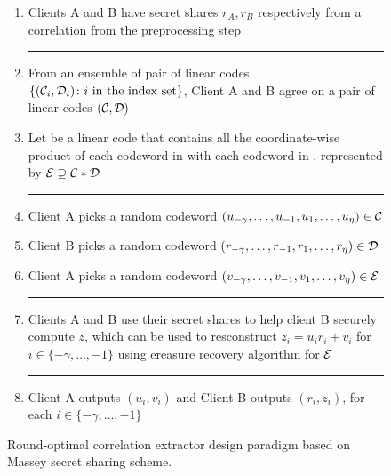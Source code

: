\begin{figure}[htp]%
\begin{boxedalgo}
\begin{enumerate}[leftmargin=5mm]
\item Clients A and B have secret shares $r_A, r_B $ respectively from a correlation from the preprocessing step\\
\hrule
\item %
  From an ensemble of pair of linear codes $\left\{({\mathcal C}_i,{\mathcal D}_i)\colon i\text{ in the index set}\right\}$, Client A and B agree on a pair of linear codes $({\mathcal C},{\mathcal D})$
\item Let \cE be a linear code that contains all the coordinate-wise product of each codeword in \cC with each codeword in \cD, represented by ${\mathcal E} \supseteq {\mathcal C}*{\mathcal D}$ \\
\hrule
\item Client A picks a random codeword $(u_{-\gamma},\dotsc,u_{-1},u_1,\dotsc,u_\eta)\in{\mathcal C}$
\item Client B picks a random codeword $(r_{-\gamma},\dotsc,r_{-1},r_1,\dotsc,r_\eta)\in{\mathcal D}$
\item Client A picks a random codeword $(v_{-\gamma},\dotsc,v_{-1},v_1,\dotsc,v_\eta)\in{\mathcal E}$ \\ 
\hrule 
\item Clients A and B use their secret shares to help client B securely compute $ z $, which can be used to resconstruct $ z_i = u_i r_i + v_i $ for $ i \in \{-\gamma, \dotsc, -1 \} $ using ereasure recovery algorithm for $ {\mathcal E} $
\hrule 
\item Client A outputs $(u_i,v_i)$ and Client B outputs $(r_i,z_i)$, for each $i\in\{-\gamma,\dotsc,-1\}$ 
\end{enumerate}
\end{boxedalgo}
\caption{Round-optimal correlation extractor design paradigm based on Massey secret sharing scheme.}
\label{fig:paradigm}
\end{figure}











